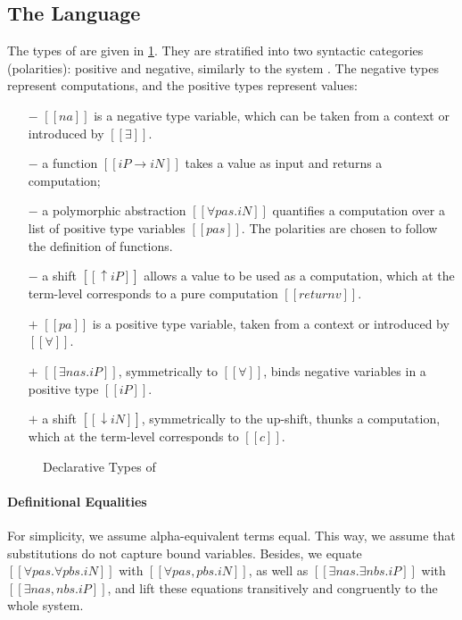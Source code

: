 \subsection{The Language}

The types of \fexists are given in \cref{fig:declarative-types}.
They are stratified into two syntactic 
categories (polarities): positive and negative,  
similarly to the \CBPV system \cite{levy2006:cbpv}.
The negative types represent computations, and the positive types represent values:
\begin{itemize}
\item [$-$] $[[na]]$ is a negative type variable, which can be taken from a context or introduced by $[[∃]]$.
\item [$-$] a function $[[iP → iN]]$ takes a value as input and returns a computation; 
\item [$-$] a polymorphic abstraction $[[∀pas.iN]]$ quantifies a computation over
  a list of positive type variables 
  $[[pas]]$. The polarities are chosen to follow the definition of functions.
\item [$-$] a shift $[[↑iP]]$ allows a value to be used as a computation, 
  which at the term-level corresponds to a pure computation $[[return v]]$.
\item [$+$] $[[pa]]$ is a positive type variable, taken from a context or introduced by $[[∀]]$.
\item [$+$] $[[∃nas.iP]]$, symmetrically to $[[∀]]$, 
  binds negative variables in a positive type $[[iP]]$. 
\item [$+$] a shift $[[↓iN]]$, symmetrically to the up-shift, 
  thunks a computation, which at the term-level corresponds to $[[ {c} ]]$.
\end{itemize}

\begin{figure}[h]
  \begin{multicols}{2}
    \ottgrammartabular{
      \ottiN\ottinterrule
    }

    \ottgrammartabular{
      \ottiP\ottinterrule
    }
    \columnbreak
  \end{multicols}
  \caption{Declarative Types of \fexists}
  \label{fig:declarative-types}
\end{figure}

\paragraph{Definitional Equalities}
For simplicity, we assume alpha-equivalent terms equal.
This way, we assume that substitutions do not capture bound variables.
Besides, we equate
$[[∀pas.∀pbs.iN]]$ with $[[∀pas,pbs.iN]]$, 
as well as $[[∃nas.∃nbs.iP]]$ with $[[∃nas,nbs.iP]]$,
and lift these equations transitively and congruently 
to the whole system.

